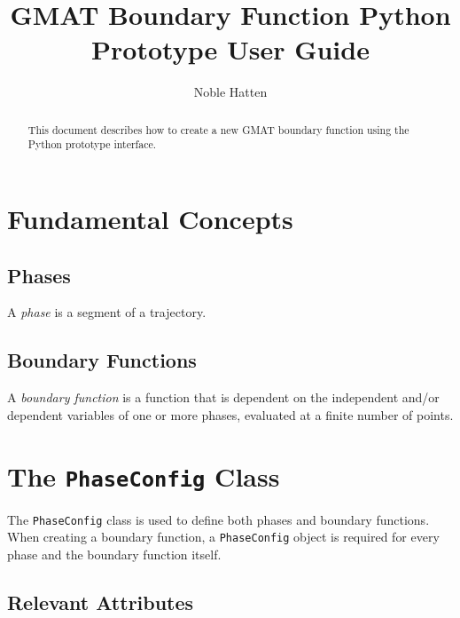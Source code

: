 \documentclass[]{article}
\title{GMAT Boundary Function Python Prototype User Guide}
\author{Noble Hatten}
\begin{document}

\maketitle

\tableofcontents

\begin{abstract}

This document describes how to create a new GMAT boundary function using the Python prototype interface.
\end{abstract}

\section{Fundamental Concepts}

\subsection{Phases}

A \emph{phase} is a segment of a trajectory.

\subsection{Boundary Functions}

A \emph{boundary function} is a function that is dependent on the independent and/or dependent variables of one or more phases, evaluated at a finite number of points.

\section{The \texttt{PhaseConfig} Class}

The \texttt{PhaseConfig} class is used to define both phases and boundary functions. When creating a boundary function, a \texttt{PhaseConfig} object is required for every phase and the boundary function itself.

\subsection{Relevant Attributes}
\end{document}
